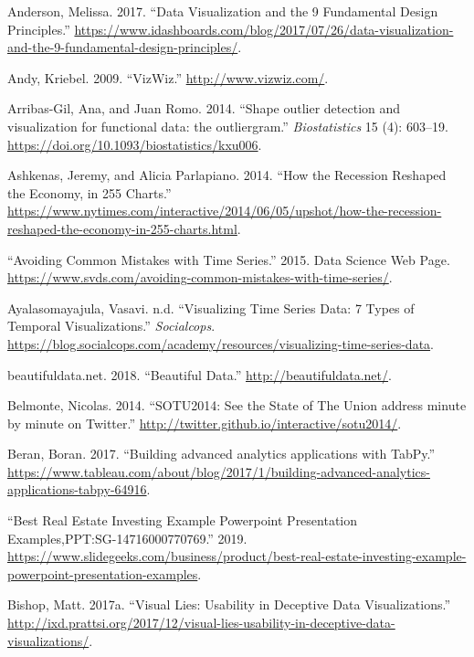 \documentclass[]{book}
\begin{document}
\leavevmode\hypertarget{ref-design_principles}{}%
Anderson, Melissa. 2017. ``Data Visualization and the 9 Fundamental Design Principles.'' \url{https://www.idashboards.com/blog/2017/07/26/data-visualization-and-the-9-fundamental-design-principles/}.

\leavevmode\hypertarget{ref-vizwiz}{}%
Andy, Kriebel. 2009. ``VizWiz.'' \url{http://www.vizwiz.com/}.

\leavevmode\hypertarget{ref-outliar}{}%
Arribas-Gil, Ana, and Juan Romo. 2014. ``Shape outlier detection and visualization for functional data: the outliergram.'' \emph{Biostatistics} 15 (4): 603--19. \url{https://doi.org/10.1093/biostatistics/kxu006}.

\leavevmode\hypertarget{ref-recession_economy}{}%
Ashkenas, Jeremy, and Alicia Parlapiano. 2014. ``How the Recession Reshaped the Economy, in 255 Charts.'' \url{https://www.nytimes.com/interactive/2014/06/05/upshot/how-the-recession-reshaped-the-economy-in-255-charts.html}.

\leavevmode\hypertarget{ref-TimeSeries}{}%
``Avoiding Common Mistakes with Time Series.'' 2015. Data Science Web Page. \url{https://www.svds.com/avoiding-common-mistakes-with-time-series/}.

\leavevmode\hypertarget{ref-aya-time-series}{}%
Ayalasomayajula, Vasavi. n.d. ``Visualizing Time Series Data: 7 Types of Temporal Visualizations.'' \emph{Socialcops}. \url{https://blog.socialcops.com/academy/resources/visualizing-time-series-data}.

\leavevmode\hypertarget{ref-data_beaut}{}%
beautifuldata.net. 2018. ``Beautiful Data.'' \url{http://beautifuldata.net/}.

\leavevmode\hypertarget{ref-SotU2014}{}%
Belmonte, Nicolas. 2014. ``SOTU2014: See the State of The Union address minute by minute on Twitter.'' \url{http://twitter.github.io/interactive/sotu2014/}.

\leavevmode\hypertarget{ref-TabPy}{}%
Beran, Boran. 2017. ``Building advanced analytics applications with TabPy.'' \url{https://www.tableau.com/about/blog/2017/1/building-advanced-analytics-applications-tabpy-64916}.

\leavevmode\hypertarget{ref-slide_geeks}{}%
``Best Real Estate Investing Example Powerpoint Presentation Examples,PPT:SG-14716000770769.'' 2019. \url{https://www.slidegeeks.com/business/product/best-real-estate-investing-example-powerpoint-presentation-examples}.

\leavevmode\hypertarget{ref-visual-lies}{}%
Bishop, Matt. 2017a. ``Visual Lies: Usability in Deceptive Data Visualizations.'' \url{http://ixd.prattsi.org/2017/12/visual-lies-usability-in-deceptive-data-visualizations/}.
\end{document}
